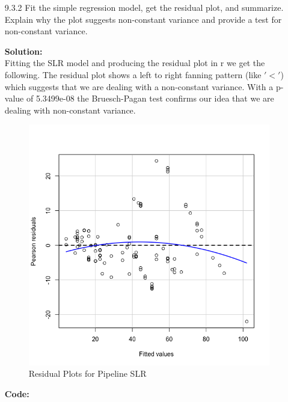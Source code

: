 \documentclass[12pt]{article}
\makeatletter
\theoremstyle{homework}
\newenvironment{exercise}[1]
{\def\@currentlabel{#1}\exercisecore}
{\endexercisecore}
\newcommand{\localhead}[1]{\par\smallskip\noindent\textbf{#1}\nobreak\\}%
\newcommand\solution{\localhead{Solution:}}
\makeatother
\begin{document}
\begin{exercise}{2}
\begin{enumerate}
    \item[9.3.2] Fit the simple regression model, get the residual plot, and summarize. Explain why the plot suggests non-constant variance and 
    provide a test for non-constant variance.\\
    \solution Fitting the SLR model and producing the residual plot in r we get the following. The residual plot shows a left to right fanning pattern (like $'<'$)
    which suggests that we are dealing with a non-constant variance. With a p-value of 5.3499e-08 the Bruesch-Pagan test confirms our idea that we are dealing with non-constant variance. 

    \begin{figure}[H]
      \begin{center}
      \caption{Residual Plots for Pipeline SLR}
      \includegraphics[width = .94\textwidth]{Rplot02.png}
    \end{center}
  \end{figure}
  \textbf{Code:}
  \begin{center}
  
  \end{center} 
  \end{enumerate}
\end{exercise}
\newpage
\end{document}
